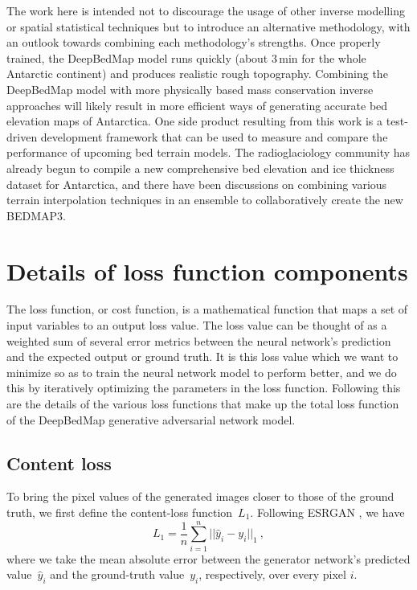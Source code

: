 \documentclass[tc, noline]{copernicus}
\begin{document}
The work here is intended not to discourage the usage of other inverse modelling or spatial statistical techniques but to introduce an alternative
methodology, with an outlook towards combining each methodology's strengths. Once properly trained, the DeepBedMap model runs quickly (about 3\,min for the
whole Antarctic continent) and produces realistic rough topography. Combining the DeepBedMap model with more physically based mass conservation
inverse approaches \citep[e.g.][]{MorlighemDeepglacialtroughs2019} will likely result in more efficient ways of generating accurate bed elevation maps
of Antarctica. One side product resulting from this work is a test-driven development framework that can be used to measure and compare the
performance of upcoming bed terrain models. The radioglaciology community has already begun to compile a new comprehensive bed elevation and ice thickness dataset for Antarctica, and there have been discussions on combining various terrain interpolation techniques in an ensemble to collaboratively create
the new BEDMAP3.


\hack{\clearpage}

\appendix

\section{Details of loss function components}\label{appendix:A}

The loss function, or cost function, is a mathematical function that maps a set of input variables to an output loss value. The loss value can be
thought of as a weighted sum of several error metrics between the neural network's prediction and the expected output or ground truth. It is this loss
value which we want to minimize so as to train the neural network model to perform better, and we do this by iteratively optimizing the parameters in
the loss function. Following this are the details of the various loss functions that make up the total loss function of the DeepBedMap generative
adversarial network model.


\subsection{Content loss}

To bring the pixel values of the generated images closer to those of the ground truth, we first define the content-loss function~$L_1$. Following ESRGAN
\citep{WangESRGANEnhancedSuperResolution2019}, we have
\begin{equation}\label{eq:A1}
L_1 = \dfrac{1}{n} \sum\limits_{i=1}^n ||\hat{y}_i - y_i||_{1}~,
\end{equation}
where we take the mean absolute error between the generator network's predicted value~$\hat{y}_i$ and the ground-truth value~$y_i$, respectively, over
every pixel $i$.
\end{document}
